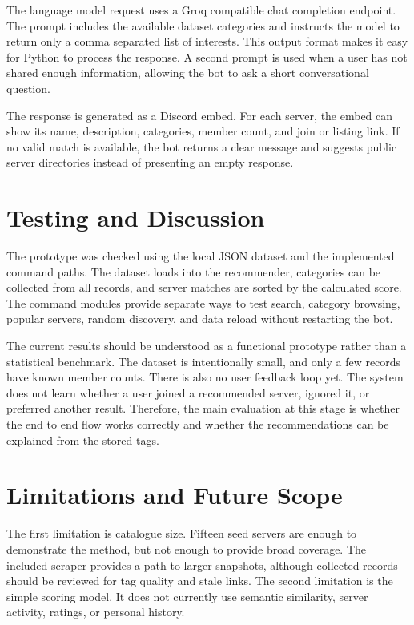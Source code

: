 \documentclass[11pt,a4paper]{article}
\begin{document}
The language model request uses a Groq compatible chat completion endpoint. The prompt includes the available dataset categories and instructs the model to return only a comma separated list of interests. This output format makes it easy for Python to process the response. A second prompt is used when a user has not shared enough information, allowing the bot to ask a short conversational question.

The response is generated as a Discord embed. For each server, the embed can show its name, description, categories, member count, and join or listing link. If no valid match is available, the bot returns a clear message and suggests public server directories instead of presenting an empty response.

\section{Testing and Discussion}

The prototype was checked using the local JSON dataset and the implemented command paths. The dataset loads into the recommender, categories can be collected from all records, and server matches are sorted by the calculated score. The command modules provide separate ways to test search, category browsing, popular servers, random discovery, and data reload without restarting the bot.

The current results should be understood as a functional prototype rather than a statistical benchmark. The dataset is intentionally small, and only a few records have known member counts. There is also no user feedback loop yet. The system does not learn whether a user joined a recommended server, ignored it, or preferred another result. Therefore, the main evaluation at this stage is whether the end to end flow works correctly and whether the recommendations can be explained from the stored tags.

\section{Limitations and Future Scope}

The first limitation is catalogue size. Fifteen seed servers are enough to demonstrate the method, but not enough to provide broad coverage. The included scraper provides a path to larger snapshots, although collected records should be reviewed for tag quality and stale links. The second limitation is the simple scoring model. It does not currently use semantic similarity, server activity, ratings, or personal history.
\end{document}
